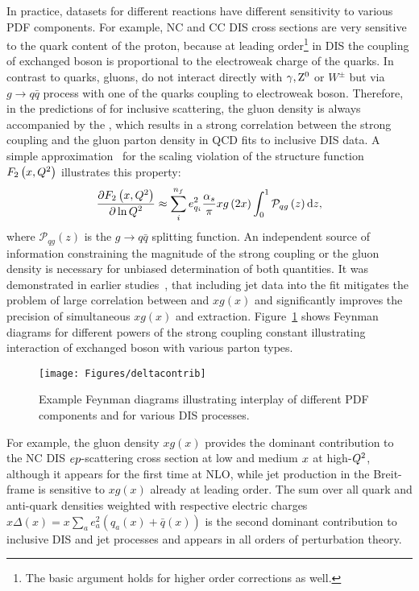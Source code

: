 In practice, datasets for different reactions have different sensitivity to various PDF components. For example, NC and CC DIS cross sections are very sensitive to the quark content of the proton, because at leading order\footnote{The basic argument holds for higher order corrections as well.} in DIS the coupling of exchanged boson is proportional to the electroweak charge of the quarks. In contrast to quarks, gluons, do not interact directly with $\gamma,\mbox{$\rm{Z}^0$}$ or $W^{\pm}$ but via $g\rightarrow q\bar q$ process with one of the quarks coupling to electroweak boson. Therefore, in the predictions of for inclusive \ep scattering, the gluon density is always accompanied by the \as, which results in a strong correlation between the strong coupling and the gluon parton density in QCD fits to inclusive DIS data. A simple approximation~\cite{Prytz:1993vr} for the scaling violation of the structure function $F_2\left(x,\mbox{${Q^2}$} \right)$ illustrates this property:
\begin{equation}
 \frac{\partial F_2\left(x,\mbox{${Q^2}$} \right)}{\partial \ln \mbox{${Q^2}$}} \approx \sum_i^{n_f}e_{q_i}^2 \frac{\mbox{$\alpha_{s}$}}{\pi} xg\left(2x\right) \int_0^1 \mathcal{P}_{qg}\left(z\right)\mathrm{d}z, 
\end{equation}
where $\mathcal{P}_{qg}\left(z\right)$ is the $g\rightarrow q\bar q$ splitting function. An independent source of information constraining the magnitude of the strong coupling or the gluon density is necessary for unbiased determination of both quantities. It was demonstrated in earlier studies~\cite{Chekanov:2005nn,H1prelim-11-143,ZEUS-prel-11-010}, that including jet data into the fit mitigates the problem of large correlation between \as and $xg\left(x\right)$ and significantly improves the precision of simultaneous $xg\left(x\right)$ and \as extraction. Figure~\ref{fig:pdfcontributions} shows Feynman diagrams for different powers of the strong coupling constant illustrating interaction of exchanged boson with various parton types.
\begin{figure}[tp]
 \centering
 \begin{center}
 \texttt{[image: Figures/deltacontrib]}
\end{center}
 \caption{Example Feynman diagrams illustrating interplay of different PDF components and \as for various DIS processes.}
 \label{fig:pdfcontributions}
\end{figure}
For example, the gluon density $xg\left(x\right)$ provides the dominant contribution to the NC DIS $\mbox{$e p$}$-scattering cross section at low and medium $\mbox{${x}$}$ at high-$\mbox{${Q^2}$}$, although it appears for the first time at NLO, while jet production in the Breit-frame is sensitive to $xg\left(x\right)$ already at leading order. The sum over all quark and anti-quark densities weighted with respective electric charges $x\Delta\left(x\right)=x\sum_{a}{e_a^2\left(q_a\left(x\right)+\bar{q}\left(x\right)\right)}$ is the second dominant contribution to inclusive DIS and jet processes and appears in all orders of perturbation theory.

